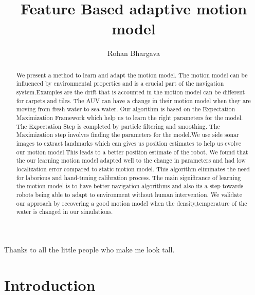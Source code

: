 \documentclass[12pt]{dalcsthesis}
\begin{document}
\mcs  %
\title{Feature Based adaptive motion model}
\author{Rohan Bhargava}


\providecommand{\tabularnewline}{\\}
\newcommand{\lyxdot}{.}
\nolistoftables
\nolistoffigures

\frontmatter

\begin{abstract}
We present a method to learn and adapt the motion model. The motion model can be influenced by environmental properties and is a crucial part of the navigation system.Examples are the drift that is accounted in the motion model can be different for carpets and tiles. The AUV can have a change in their motion model when they are moving from fresh water to sea water. Our algorithm is based on the Expectation Maximization Framework which help us to learn the right parameters for the model.
The Expectation Step is completed by particle filtering and smoothing. The Maximization step involves finding the parameters for the model.We use side sonar images to extract landmarks which can gives us position estimates to help us evolve our motion model.This leads to a better position estimate of the robot. 
We found that the our learning motion model adapted well to the change in parameters and had low localization error compared to static motion model. 
This algorithm eliminates the need for laborious and hand-tuning calibration process. The main significance of learning the motion model is to have better navigation algorithms and also its a step towards robots being able to adapt to environment without human intervention.
We validate our approach by recovering a good motion model when the density,temperature of the water is changed in our simulations. 
\end{abstract}

\begin{acknowledgements}
Thanks to all the little people who make me look tall.
\end{acknowledgements}

\mainmatter

\chapter{Introduction}
 
\end{document}
